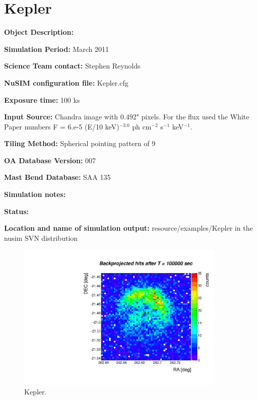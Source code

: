 
\newpage

\section{Kepler}

\textbf{Object Description:}

\textbf{Simulation Period:} March 2011

\textbf{Science Team contact:} Stephen Reynolds

\textbf{NuSIM configuration file:} Kepler.cfg

\textbf{Exposure time:} 100 ks

\textbf{Input Source:} Chandra image with 0.492" pixels.  For the flux used the White Paper numbers F = 6.e-5 (E/10 keV)$^{-3.0}$ ph cm$^{-2}$ s$^{-1}$ keV$^{-1}$.

\textbf{Tiling Method:} Spherical pointing pattern of 9

\textbf{OA Database Version:} 007

\textbf{Mast Bend Database:} SAA 135

\textbf{Simulation notes:} 

\textbf{Status:} 

\textbf{Location and name of simulation output:} resource/examples/Kepler in the nusim SVN distribution

\begin{figure}[h]
\begin{center}
\includegraphics[width=10cm]{Kepler/Kepler.pdf}  %
\caption{Kepler.}
\label{kepler} 
\end{center}
\end{figure}

